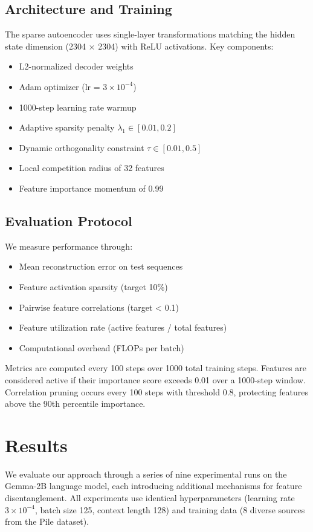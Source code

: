 \documentclass{article} %
\begin{document}
\subsection{Architecture and Training}
The sparse autoencoder uses single-layer transformations matching the hidden state dimension (2304 $\times$ 2304) with ReLU activations. Key components:
\begin{itemize}
    \item L2-normalized decoder weights
    \item Adam optimizer (lr = $3 \times 10^{-4}$)
    \item 1000-step learning rate warmup
    \item Adaptive sparsity penalty $\lambda_1 \in [0.01, 0.2]$
    \item Dynamic orthogonality constraint $\tau \in [0.01, 0.5]$
    \item Local competition radius of 32 features
    \item Feature importance momentum of 0.99
\end{itemize}

\subsection{Evaluation Protocol}
We measure performance through:
\begin{itemize}
    \item Mean reconstruction error on test sequences
    \item Feature activation sparsity (target 10\%)
    \item Pairwise feature correlations (target < 0.1)
    \item Feature utilization rate (active features / total features)
    \item Computational overhead (FLOPs per batch)
\end{itemize}

Metrics are computed every 100 steps over 1000 total training steps. Features are considered active if their importance score exceeds 0.01 over a 1000-step window. Correlation pruning occurs every 100 steps with threshold 0.8, protecting features above the 90th percentile importance.

\section{Results}
\label{sec:results}

We evaluate our approach through a series of nine experimental runs on the Gemma-2B language model, each introducing additional mechanisms for feature disentanglement. All experiments use identical hyperparameters (learning rate $3\times10^{-4}$, batch size 125, context length 128) and training data (8 diverse sources from the Pile dataset).
\end{document}
